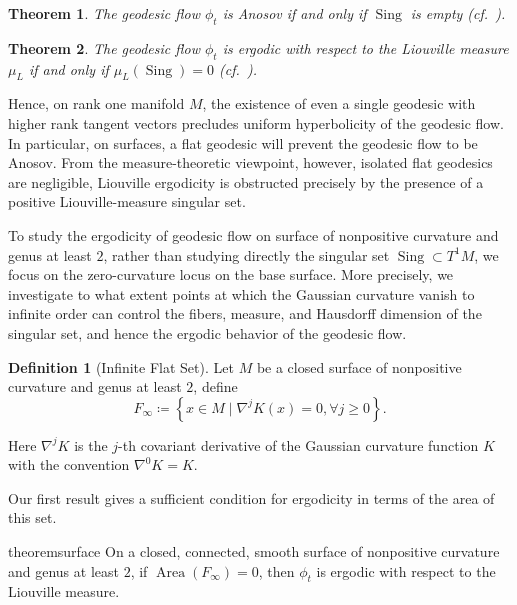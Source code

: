 \documentclass[reqno,11pt]{article}
\newtheorem{theorem}{Theorem}[section]
\theoremstyle{definition}
\newtheorem{definition}{Definition}[section]
\theoremstyle{remark}
\numberwithin{equation}{section}
\DeclareMathOperator{\area}{Area}
\DeclareMathOperator{\sing}{Sing}
\begin{document}
\begin{theorem}\label{thm_2_1}
	The geodesic flow $\phi_t$ is Anosov if and only if $\sing$ is empty (cf.~\cite{Eberlein1973}).
\end{theorem}

\begin{theorem}\label{thm_2_2}
	The geodesic flow $\phi_t$ is ergodic with respect to the Liouville measure $\mu_L$ if and only if $\mu_L(\sing)=0$ (cf.~\cite{Burns1983, BurnsMatveev2021}).
\end{theorem}

Hence, on rank one manifold $M$, the existence of even a single geodesic with higher rank tangent vectors precludes uniform hyperbolicity of the geodesic flow. In particular, on surfaces, a flat geodesic will prevent the geodesic flow to be Anosov. From the measure-theoretic viewpoint, however, isolated flat geodesics are negligible, Liouville ergodicity is obstructed precisely by the presence of a positive Liouville-measure singular set.

To study the ergodicity of geodesic flow on surface of nonpositive curvature and genus at least $2$, rather than studying directly the singular set $\sing \subset T^{1}M$, we focus on the zero-curvature locus on the base surface. More precisely, we investigate to what extent points at which the Gaussian curvature vanish to infinite order can control the fibers, measure, and Hausdorff dimension of the singular set, and hence the ergodic behavior of the geodesic flow.

\begin{definition}[Infinite Flat Set]\label{def_2_1}
	Let $M$ be a closed surface of nonpositive curvature and genus at least $2$, define
	\begin{displaymath}
		F_{\infty}\coloneq\left\{x\in M \mid \nabla^{j}K(x)=0, \forall j\geq 0\right\}.
	\end{displaymath}

	Here $\nabla^{j} K$ is the $j$-th covariant derivative of the Gaussian curvature function $K$ with the convention $\nabla^{0}K=K$.
\end{definition}

Our first result gives a sufficient condition for ergodicity in terms of the area of this set.
\begin{restatable}{theorem}{surface}\label{thm_2_3}
	On a closed, connected, smooth surface of nonpositive curvature and genus at least $2$, if $\area(F_{\infty})=0$, then $\phi_t$ is ergodic with respect to the Liouville measure.
\end{restatable}
\end{document}
